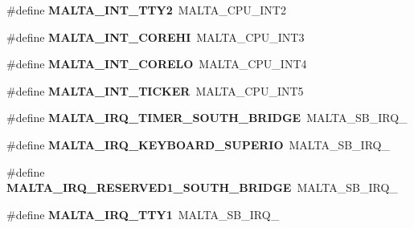\begin{DoxyCompactItemize}
\item 
\mbox{\label{group__bsp__interrupt_ga4967ae8e1f9b23186d6504d5aff0a6e9}} 
\#define {\bfseries M\+A\+L\+T\+A\+\_\+\+I\+N\+T\+\_\+\+T\+T\+Y2}~M\+A\+L\+T\+A\+\_\+\+C\+P\+U\+\_\+\+I\+N\+T2
\item 
\mbox{\label{group__bsp__interrupt_gaa41c544632185d5104d8b9a8cd2cb568}} 
\#define {\bfseries M\+A\+L\+T\+A\+\_\+\+I\+N\+T\+\_\+\+C\+O\+R\+E\+HI}~M\+A\+L\+T\+A\+\_\+\+C\+P\+U\+\_\+\+I\+N\+T3
\item 
\mbox{\label{group__bsp__interrupt_ga1a1a2223d9617f702195fc6f32e7273d}} 
\#define {\bfseries M\+A\+L\+T\+A\+\_\+\+I\+N\+T\+\_\+\+C\+O\+R\+E\+LO}~M\+A\+L\+T\+A\+\_\+\+C\+P\+U\+\_\+\+I\+N\+T4
\item 
\mbox{\label{group__bsp__interrupt_ga2b312e97c24b999e495151b504e66d7e}} 
\#define {\bfseries M\+A\+L\+T\+A\+\_\+\+I\+N\+T\+\_\+\+T\+I\+C\+K\+ER}~M\+A\+L\+T\+A\+\_\+\+C\+P\+U\+\_\+\+I\+N\+T5
\item 
\mbox{\label{group__bsp__interrupt_ga2d92d3e63e479db966c7671f250b35aa}} 
\#define {\bfseries M\+A\+L\+T\+A\+\_\+\+I\+R\+Q\+\_\+\+T\+I\+M\+E\+R\+\_\+\+S\+O\+U\+T\+H\+\_\+\+B\+R\+I\+D\+GE}~M\+A\+L\+T\+A\+\_\+\+S\+B\+\_\+\+I\+R\+Q\+\_
\item 
\mbox{\label{group__bsp__interrupt_gaa9a9dec6264e6e634880d266942ebd46}} 
\#define {\bfseries M\+A\+L\+T\+A\+\_\+\+I\+R\+Q\+\_\+\+K\+E\+Y\+B\+O\+A\+R\+D\+\_\+\+S\+U\+P\+E\+R\+IO}~M\+A\+L\+T\+A\+\_\+\+S\+B\+\_\+\+I\+R\+Q\+\_
\item 
\mbox{\label{group__bsp__interrupt_gaa654021f043a2344bfbd32d95cf99ead}} 
\#define {\bfseries M\+A\+L\+T\+A\+\_\+\+I\+R\+Q\+\_\+\+R\+E\+S\+E\+R\+V\+E\+D1\+\_\+\+S\+O\+U\+T\+H\+\_\+\+B\+R\+I\+D\+GE}~M\+A\+L\+T\+A\+\_\+\+S\+B\+\_\+\+I\+R\+Q\+\_
\item 
\mbox{\label{group__bsp__interrupt_ga08c388e8bc4004e74bef8cdd3485c2e7}} 
\#define {\bfseries M\+A\+L\+T\+A\+\_\+\+I\+R\+Q\+\_\+\+T\+T\+Y1}~M\+A\+L\+T\+A\+\_\+\+S\+B\+\_\+\+I\+R\+Q\+\_
\item 

\end{DoxyCompactItemize}
